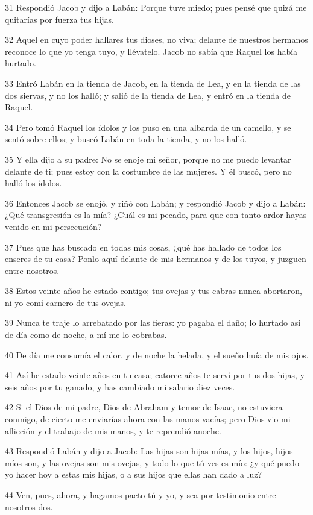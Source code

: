 31 Respondió Jacob y dijo a Labán: Porque tuve miedo; pues pensé que quizá me quitarías por fuerza tus hijas.

32 Aquel en cuyo poder hallares tus dioses, no viva; delante de nuestros hermanos reconoce lo que yo tenga tuyo, y llévatelo. Jacob no sabía que Raquel los había hurtado.

33 Entró Labán en la tienda de Jacob, en la tienda de Lea, y en la tienda de las dos siervas, y no los halló; y salió de la tienda de Lea, y entró en la tienda de Raquel.

34 Pero tomó Raquel los ídolos y los puso en una albarda de un camello, y se sentó sobre ellos; y buscó Labán en toda la tienda, y no los halló.

35 Y ella dijo a su padre: No se enoje mi señor, porque no me puedo levantar delante de ti; pues estoy con la costumbre de las mujeres. Y él buscó, pero no halló los ídolos.

36 Entonces Jacob se enojó, y riñó con Labán; y respondió Jacob y dijo a Labán: ¿Qué transgresión es la mía? ¿Cuál es mi pecado, para que con tanto ardor hayas venido en mi persecución?

37 Pues que has buscado en todas mis cosas, ¿qué has hallado de todos los enseres de tu casa? Ponlo aquí delante de mis hermanos y de los tuyos, y juzguen entre nosotros.

38 Estos veinte años he estado contigo; tus ovejas y tus cabras nunca abortaron, ni yo comí carnero de tus ovejas.

39 Nunca te traje lo arrebatado por las fieras: yo pagaba el daño; lo hurtado así de día como de noche, a mí me lo cobrabas.

40 De día me consumía el calor, y de noche la helada, y el sueño huía de mis ojos.

41 Así he estado veinte años en tu casa; catorce años te serví por tus dos hijas, y seis años por tu ganado, y has cambiado mi salario diez veces.

42 Si el Dios de mi padre, Dios de Abraham y temor de Isaac, no estuviera conmigo, de cierto me enviarías ahora con las manos vacías; pero Dios vio mi aflicción y el trabajo de mis manos, y te reprendió anoche.

43 Respondió Labán y dijo a Jacob: Las hijas son hijas mías, y los hijos, hijos míos son, y las ovejas son mis ovejas, y todo lo que tú ves es mío: ¿y qué puedo yo hacer hoy a estas mis hijas, o a sus hijos que ellas han dado a luz?

44 Ven, pues, ahora, y hagamos pacto tú y yo, y sea por testimonio entre nosotros dos.

